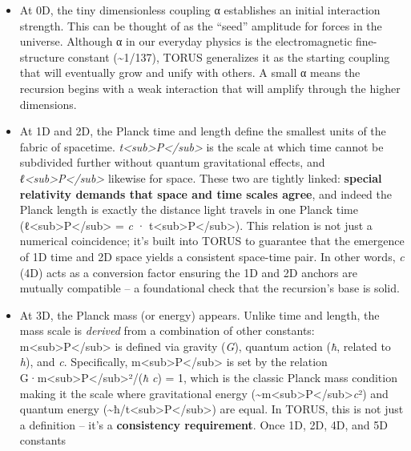 \documentclass[
]{article}
\begin{document}
\begin{itemize}
\item
  At 0D, the tiny dimensionless coupling α establishes an initial
  interaction strength. This can be thought of as the ``seed'' amplitude
  for forces in the universe. Although α in our everyday physics is the
  electromagnetic fine-structure constant (\textasciitilde1/137), TORUS
  generalizes it as the starting coupling that will eventually grow and
  unify with others. A small α means the recursion begins with a weak
  interaction that will amplify through the higher dimensions.
\item
  At 1D and 2D, the Planck time and length define the smallest units of
  the fabric of spacetime.
  \emph{t\textless sub\textgreater P\textless/sub\textgreater{}} is the
  scale at which time cannot be subdivided further without quantum
  gravitational effects, and
  \emph{ℓ\textless sub\textgreater P\textless/sub\textgreater{}}
  likewise for space. These two are tightly linked: \textbf{special
  relativity demands that space and time scales agree}, and indeed the
  Planck length is exactly the distance light travels in one Planck time
  (ℓ\textless sub\textgreater P\textless/sub\textgreater{} = \emph{c} ·
  t\textless sub\textgreater P\textless/sub\textgreater)\hspace{0pt}.
  This relation is not just a numerical coincidence; it's built into
  TORUS to guarantee that the emergence of 1D time and 2D space yields a
  consistent space-time pair. In other words, \emph{c} (4D) acts as a
  conversion factor ensuring the 1D and 2D anchors are mutually
  compatible -- a foundational check that the recursion's base is solid.
\item
  At 3D, the Planck mass (or energy) appears. Unlike time and length,
  the mass scale is \emph{derived} from a combination of other
  constants: m\textless sub\textgreater P\textless/sub\textgreater{} is
  defined via gravity (\emph{G}), quantum action (\emph{ħ}, related to
  \emph{h}), and \emph{c}. Specifically,
  m\textless sub\textgreater P\textless/sub\textgreater{} is set by the
  relation
  G·m\textless sub\textgreater P\textless/sub\textgreater²/(\emph{ħ}
  \emph{c}) = 1, which is the classic Planck mass condition making it
  the scale where gravitational energy
  (\textasciitilde m\textless sub\textgreater P\textless/sub\textgreater{}\emph{c}²)
  and quantum energy
  (\textasciitilde ħ/t\textless sub\textgreater P\textless/sub\textgreater)
  are equal. In TORUS, this is not just a definition -- it's a
  \textbf{consistency requirement}. Once 1D, 2D, 4D, and 5D constants

\end{itemize}
\end{document}
